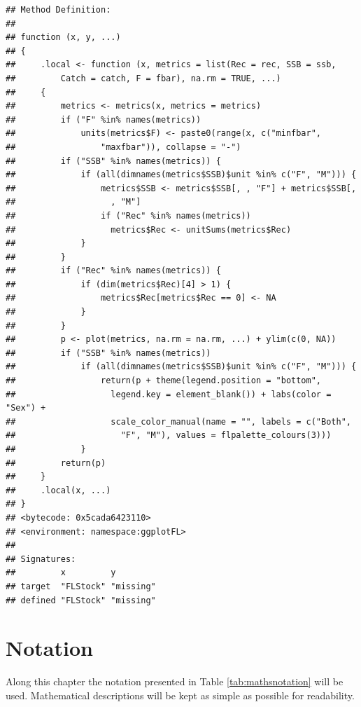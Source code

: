 \documentclass[
]{book}
\begin{document}
\begin{verbatim}
## Method Definition:
## 
## function (x, y, ...) 
## {
##     .local <- function (x, metrics = list(Rec = rec, SSB = ssb, 
##         Catch = catch, F = fbar), na.rm = TRUE, ...) 
##     {
##         metrics <- metrics(x, metrics = metrics)
##         if ("F" %in% names(metrics)) 
##             units(metrics$F) <- paste0(range(x, c("minfbar", 
##                 "maxfbar")), collapse = "-")
##         if ("SSB" %in% names(metrics)) {
##             if (all(dimnames(metrics$SSB)$unit %in% c("F", "M"))) {
##                 metrics$SSB <- metrics$SSB[, , "F"] + metrics$SSB[, 
##                   , "M"]
##                 if ("Rec" %in% names(metrics)) 
##                   metrics$Rec <- unitSums(metrics$Rec)
##             }
##         }
##         if ("Rec" %in% names(metrics)) {
##             if (dim(metrics$Rec)[4] > 1) {
##                 metrics$Rec[metrics$Rec == 0] <- NA
##             }
##         }
##         p <- plot(metrics, na.rm = na.rm, ...) + ylim(c(0, NA))
##         if ("SSB" %in% names(metrics)) 
##             if (all(dimnames(metrics$SSB)$unit %in% c("F", "M"))) {
##                 return(p + theme(legend.position = "bottom", 
##                   legend.key = element_blank()) + labs(color = "Sex") + 
##                   scale_color_manual(name = "", labels = c("Both", 
##                     "F", "M"), values = flpalette_colours(3)))
##             }
##         return(p)
##     }
##     .local(x, ...)
## }
## <bytecode: 0x5cada6423110>
## <environment: namespace:ggplotFL>
## 
## Signatures:
##         x         y        
## target  "FLStock" "missing"
## defined "FLStock" "missing"
\end{verbatim}

\hypertarget{notation}{%
\section{Notation}\label{notation}}

Along this chapter the notation presented in Table \ref{tab:mathsnotation} will be used. Mathematical descriptions will be kept as simple as possible for readability.
\end{document}
